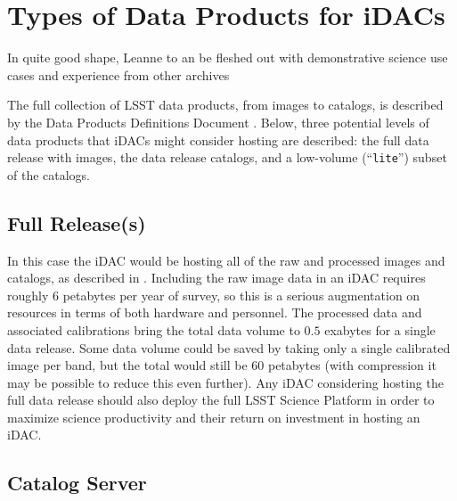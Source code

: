 \section{Types of Data Products for iDACs}\label{sec:data}

 {\color{red} In quite good shape, Leanne to an be fleshed out with demonstrative science use cases and experience from other archives} \newline

The full collection of LSST data products, from images to catalogs, is described by the Data Products Definitions Document . Below, three potential levels of data products that iDACs might consider hosting are described: the full data release with images, the data release catalogs, and a low-volume (``{\tt lite}'') subset of the catalogs.

\subsection{Full Release(s)}

In this case the iDAC would be hosting all of the raw and processed images and catalogs, as described in . Including the raw image data in an iDAC requires roughly $6$ petabytes per year of survey, so this is a serious augmentation on resources in terms of both hardware and personnel. The processed data and associated calibrations bring the total data volume to $0.5$ exabytes for a single data release. Some data volume could be saved by taking only a single calibrated image per band, but the total would still be $60$ petabytes (with compression it may be possible to reduce this even further). Any iDAC considering hosting the full data release should also deploy the full LSST Science Platform  in order to maximize science productivity and their return on investment in hosting an iDAC.

\subsection{Catalog Server}

